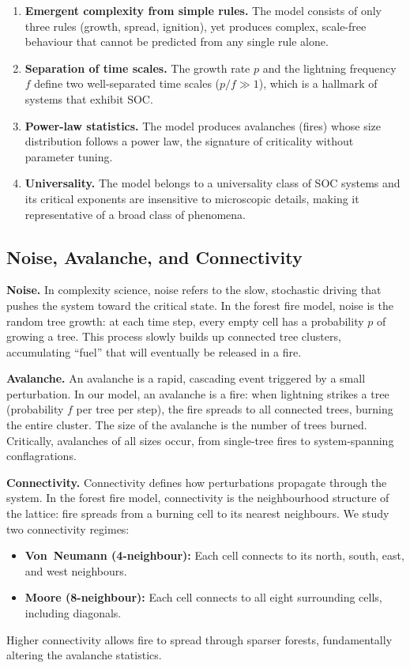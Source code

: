 \documentclass[12pt, a4paper, twocolumn]{article}
\begin{document}
\begin{enumerate}[leftmargin=*]
    \item \textbf{Emergent complexity from simple rules.}
    The model consists of only three rules (growth, spread, ignition), yet produces complex, scale-free behaviour that cannot be predicted from any single rule alone.

    \item \textbf{Separation of time scales.}
    The growth rate $p$ and the lightning frequency $f$ define two well-separated time scales ($p/f \gg 1$), which is a hallmark of systems that exhibit SOC.

    \item \textbf{Power-law statistics.}
    The model produces avalanches (fires) whose size distribution follows a power law, the signature of criticality without parameter tuning.

    \item \textbf{Universality.}
    The model belongs to a universality class of SOC systems and its critical exponents are insensitive to microscopic details, making it representative of a broad class of phenomena.
\end{enumerate}

\subsection{Noise, Avalanche, and Connectivity}
\label{sec:nac}

\textbf{Noise.}
In complexity science, noise refers to the slow, stochastic driving that pushes the system toward the critical state.
In the forest fire model, noise is the random tree growth: at each time step, every empty cell has a probability $p$ of growing a tree.
This process slowly builds up connected tree clusters, accumulating ``fuel'' that will eventually be released in a fire.

\textbf{Avalanche.}
An avalanche is a rapid, cascading event triggered by a small perturbation.
In our model, an avalanche is a fire: when lightning strikes a tree (probability $f$ per tree per step), the fire spreads to all connected trees, burning the entire cluster.
The size of the avalanche is the number of trees burned.
Critically, avalanches of all sizes occur, from single-tree fires to system-spanning conflagrations.

\textbf{Connectivity.}
Connectivity defines how perturbations propagate through the system.
In the forest fire model, connectivity is the neighbourhood structure of the lattice: fire spreads from a burning cell to its nearest neighbours.
We study two connectivity regimes:
\begin{itemize}[leftmargin=*]
    \item \textbf{Von~Neumann (4-neighbour):} Each cell connects to its north, south, east, and west neighbours.
    \item \textbf{Moore (8-neighbour):} Each cell connects to all eight surrounding cells, including diagonals.
\end{itemize}
Higher connectivity allows fire to spread through sparser forests, fundamentally altering the avalanche statistics.
\end{document}
